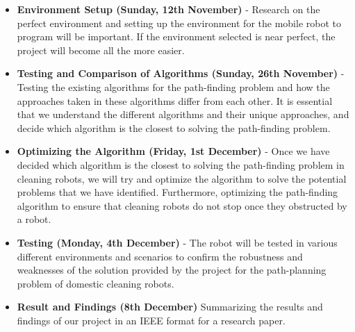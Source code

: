 \documentclass[12pt]{article}
\begin{document}
\begin{itemize}
    \item \textbf{Environment Setup (Sunday, 12th November)} - Research on the perfect environment and setting up the environment for the mobile robot to program will be important. If the environment selected is near perfect, the project will become all the more easier.
    
    \item \textbf{Testing and Comparison of Algorithms (Sunday, 26th November)} - Testing the existing algorithms for the path-finding problem and how the approaches taken in these algorithms differ from each other. It is essential that we understand the different algorithms and their unique approaches, and decide which algorithm is the closest to solving the path-finding problem.
    
    \item \textbf{Optimizing the Algorithm (Friday, 1st December)} - Once we have decided which algorithm is the closest to solving the path-finding problem in cleaning robots, we will try and optimize the algorithm to solve the potential problems that we have identified. Furthermore, optimizing the path-finding algorithm to ensure that cleaning robots do not stop once they obstructed by a robot.

    \item \textbf{Testing (Monday, 4th December)} - The robot will be tested in various different environments and scenarios to confirm the robustness and weaknesses of the solution provided by the project for the path-planning problem of domestic cleaning robots. 
    
    \item \textbf{Result and Findings (8th December)} Summarizing the results and findings of our project in an IEEE format for a research paper.
\end{itemize}
\end{document}
